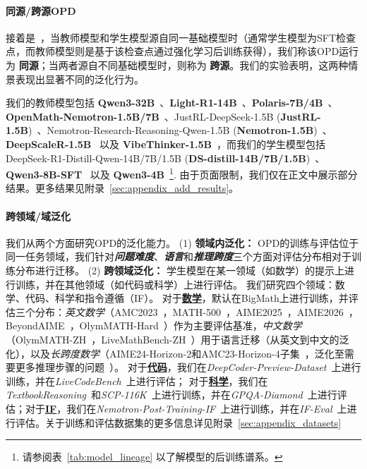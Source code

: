 \paragraph{同源/跨源OPD}
接着是~\citet{ma2026mopd}，当教师模型和学生模型源自同一基础模型时（通常学生模型为SFT检查点，而教师模型则是基于该检查点通过强化学习后训练获得），我们称该OPD运行为 \textbf{同源}；当两者源自不同基础模型时，则称为 \textbf{跨源}。我们的实验表明，这两种情景表现出显著不同的泛化行为。

我们的教师模型包括 \textbf{Qwen3-32B}~\citep{yang2025qwen3}、\textbf{Light-R1-14B}~\citep{wen2025lightr1}、\textbf{Polaris-7B/4B}~\citep{Polaris2025}、\textbf{OpenMath-Nemotron-1.5B/7B}~\cite{moshkov2025aimo2winningsolutionbuildingopenmath}、JustRL-DeepSeek-1.5B (\textbf{JustRL-1.5B})~\citep{he2025justrl}、Nemotron-Research-Reasoning-Qwen-1.5B (\textbf{Nemotron-1.5B})~\citep{liu2026prorl}、\textbf{DeepScaleR-1.5B}~\cite{tan2026deepscaler} 以及 \textbf{VibeThinker-1.5B}~\cite{xu2025tinymodelbiglogicvibethinker}，而我们的学生模型包括 DeepSeek-R1-Distill-Qwen-14B/7B/1.5B (\textbf{DS-distill-14B/7B/1.5B})~\citep{guo2025deepseekr1}、\textbf{Qwen3-8B-SFT}~\citep{lu2025onpolicydistillation} 以及 \textbf{Qwen3-4B}~\citep{yang2025qwen3}\footnote{请参阅表~\ref{tab:model_lineage} 以了解模型的后训练谱系。}. 由于页面限制，我们仅在正文中展示部分结果。更多结果见附录~\ref{sec:appendix_add_results}。

\paragraph{跨领域/域泛化}
我们从两个方面研究OPD的泛化能力。
(1) \textbf{领域内泛化：}
OPD的训练与评估位于同一任务领域，我们针对\textbf{\emph{问题难度}}、\textbf{\emph{语言}}和\textbf{\emph{推理跨度}}三个方面对评估分布相对于训练分布进行迁移。
(2) \textbf{跨领域泛化：} 学生模型在某一领域（如数学）的提示上进行训练，并在其他领域（如代码或科学）上进行评估。
我们研究四个领域：数学、代码、科学和指令遵循（IF）。
对于\textbf{\underline{数学}}，默认在BigMath上进行训练，并评估三个分布：\emph{英文数学}（AMC2023~\citep{MAA_AMC}，MATH-500~\citep{hendrycks2021measuringmath500}，AIME2025~\citep{MAA_AIME}，AIME2026~\citep{MAA_AIME}，BeyondAIME~\citep{bytedance_seed_2025_beyondaime}，OlymMATH-Hard~\citep{sun2026olymmath}）作为主要评估基准，\emph{中文数学}（OlymMATH-ZH~\citep{sun2026olymmath}，LiveMathBench-ZH~\citep{liu2025livemathbench}）用于语言迁移（从英文到中文的泛化），以及\emph{长跨度数学}（AIME24-Horizon-2和AMC23-Horizon-4子集~\citep{lu2025r}，泛化至需要更多推理步骤的问题~\citep{shojaee2025the,li2026scaling}）。
对于\textbf{\underline{代码}}，我们在\emph{DeepCoder-Preview-Dataset}~\citep{deepcoder2025}上进行训练，并在\emph{LiveCodeBench}~\citep{jain2025livecodebench}上进行评估；
对于\textbf{\underline{科学}}，我们在\emph{TextbookReasoning}~\citep{fan2025megascience}和\emph{SCP-116K}~\citep{lu2025scp}上进行训练，并在\emph{GPQA-Diamond}~\citep{rein2023gpqa}上进行评估；对于\textbf{\underline{IF}}，我们在\emph{Nemotron-Post-Training-IF}~\citep{bercovich2025llamanemotron}上进行训练，并在\emph{IF-Eval}~\citep{zhou2023instructionfollowingevaluationlargelanguage}上进行评估。关于训练和评估数据集的更多信息详见附录~\ref{sec:appendix_datasets}
